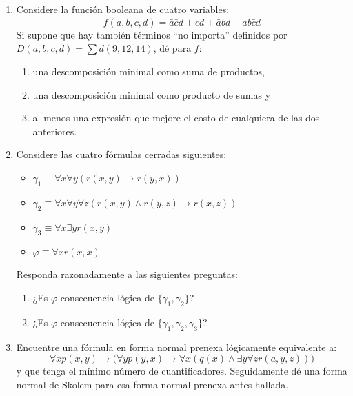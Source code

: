 \documentclass[10pt,spanish]{article}
\begin{document}
\begin{flushleft}
\begin{enumerate}
\item Considere la función booleana de cuatro variables:
  \begin{equation*}
    f(a,b,c,d)=\bar{a}\bar{c}\bar{d}+cd+\bar{a}\bar{b}d+ab\bar{c}d
  \end{equation*}
  Si supone que hay también términos ``no importa'' definidos por
  $D(a,b,c,d)=\sum d(9,12,14)$, dé para $f$:
  \begin{enumerate}
  \item una descomposición minimal como suma de productos,
  \item una descomposición minimal como producto de sumas y
  \item al menos una expresión que mejore el costo de cualquiera de
    las dos anteriores.
  \end{enumerate}

\item Considere las cuatro fórmulas cerradas siguientes:
  \begin{itemize}
  \item $\gamma_{1}\equiv \forall x\forall y (r(x,y)\to r(y,x))$
  \item $\gamma_{2}\equiv \forall x\forall y\forall z (r(x,y)\wedge
    r(y,z)\to r(x,z))$
  \item $\gamma_{3}\equiv\forall x\exists yr(x,y)$
  \item $\varphi\equiv \forall xr(x,x)$
  \end{itemize}
  Responda razonadamente a las siguientes preguntas:
  \begin{enumerate}
  \item ¿Es $\varphi$ consecuencia lógica de $\{\gamma_{1},\gamma_{2}\}$?
  \item ¿Es $\varphi$ consecuencia lógica de $\{\gamma_{1},\gamma_{2},\gamma_{3}\}$?
  \end{enumerate}
  
\item Encuentre una fórmula en forma normal prenexa lógicamente
  equivalente a:
  \begin{equation*}
    \forall xp(x,y)\to\bigl(\forall
    yp(y,x)\to\forall x(q(x)\wedge\exists y\forall
    zr(a,y,z))\bigr)
  \end{equation*}
  y que tenga el mínimo número de cuantificadores. Seguidamente dé una
  forma normal de Skolem para esa forma normal prenexa antes hallada.



\end{enumerate}
\end{flushleft}
\end{document}
